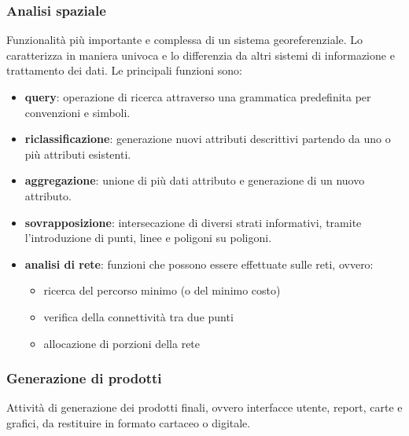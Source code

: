 \subsubsection{Analisi spaziale}
Funzionalità più importante e complessa di un sistema georeferenziale. Lo caratterizza in maniera univoca e lo differenzia da altri sistemi di informazione e trattamento dei dati.
Le principali funzioni sono:
\begin{itemize}
\item \textbf{query}: operazione di ricerca attraverso una grammatica predefinita per convenzioni e simboli.
\item \textbf{riclassificazione}: generazione nuovi attributi descrittivi partendo da uno o più attributi esistenti.
\item \textbf{aggregazione}: unione di più dati attributo e generazione di un nuovo attributo.
\item \textbf{sovrapposizione}: intersecazione di diversi strati informativi, tramite l'introduzione di punti, linee e poligoni su poligoni.
\item \textbf{analisi di rete}: funzioni che possono essere effettuate sulle reti, ovvero:
\begin{itemize}
\item ricerca del percorso minimo (o del minimo costo)
\item verifica della connettività tra due punti
\item allocazione di porzioni della rete
\end{itemize}
\end{itemize}

\subsubsection{Generazione di prodotti}
Attività di generazione dei prodotti finali, ovvero interfacce utente, report, carte e grafici, da restituire in formato cartaceo o digitale.


\clearpage{\pagestyle{empty}\cleardoublepage}